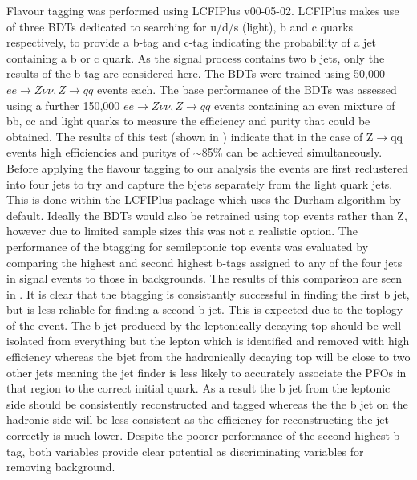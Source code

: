 Flavour tagging was performed using LCFIPlus v00-05-02\cite{Suehara:2015ura}. LCFIPlus makes use of three BDTs dedicated to searching for u/d/s (light), b and c quarks respectively, to provide a b-tag and c-tag indicating the probability of a jet containing a b or c quark. As the signal process contains two b jets, only the results of the b-tag are considered here. The BDTs were trained using 50,000 $ee\rightarrow Z\nu\nu, Z\rightarrow qq$ events each. The base performance of the BDTs was assessed using a further 150,000 $ee\rightarrow Z\nu\nu, Z\rightarrow qq$ events containing an even mixture of bb, cc and light quarks to measure the efficiency and purity that could be obtained. The results of this test (shown in ) indicate that in the case of Z$\rightarrow$qq events high efficiencies and puritys of $\sim$85\% can be achieved simultaneously. Before applying the flavour tagging to our analysis the events are first reclustered into four jets to try and capture the bjets separately from the light quark jets. This is done within the LCFIPlus package which uses the Durham algorithm by default. Ideally the BDTs would also be retrained using top events rather than Z, however due to limited sample sizes this was not a realistic option. The performance of the btagging for semileptonic top events was evaluated by comparing the highest and second highest b-tags assigned to any of the four jets in signal events to those in backgrounds. The results of this comparison are seen in . It is clear that the btagging is consistantly successful in finding the first b jet, but is less reliable for finding a second b jet. This is expected due to the toplogy of the event. The b jet produced by the leptonically decaying top should be well isolated from everything but the lepton which is identified and removed with high efficiency whereas the bjet from the hadronically decaying top will be close to two other jets meaning the jet finder is less likely to accurately associate the PFOs in that region to the correct initial quark. As a result the b jet from the leptonic side should be consistently reconstructed and tagged whereas the the b jet on the hadronic side will be less consistent as the efficiency for reconstructing the jet correctly is much lower. Despite the poorer performance of the second highest b-tag, both variables provide clear potential as discriminating variables for removing background. 


